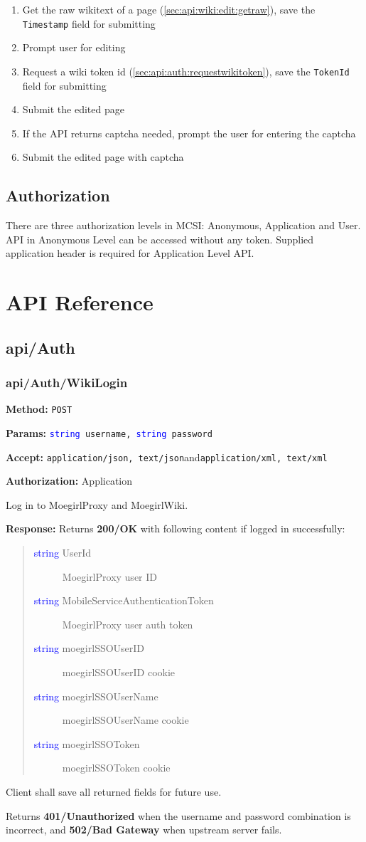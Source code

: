 \documentclass[a4paper,11pt]{report}
\newcommand{\method}[1]{\textsf{\textbf{Method:}} #1}
\newcommand{\params}[1]{\textsf{\textbf{Params:}} \texttt{#1}}
\newcommand{\accept}[1]{\textsf{\textbf{Accept:}} #1}
\newcommand{\response}[1]{\textsf{\textbf{Response:}} #1}
\newcommand{\auth}[1]{\textsf{\textbf{Authorization:}} #1}
\newcommand{\webapi}[6]{
    \method{#1}

    \params{#2}

    \accept{#3}

    \auth{#4}

    #5

    \response{#6}
    }
\newcommand{\sand}{\textsf{and}\xspace}
\newcommand{\httppost}{\texttt{POST}}
\newcommand{\json}{\texttt{application/json, text/json}\xspace}
\newcommand{\xml}{\texttt{application/xml, text/xml}\xspace}
\newcommand{\ok}{\textbf{200/OK}\xspace}
\newcommand{\unauth}{\textbf{401/Unauthorized}\xspace}
\newcommand{\badgateway}{\textbf{502/Bad Gateway}\xspace}
\newcommand{\authapp}{Application}
\newcommand{\typestring}{\textcolor{blue}{string }}
\begin{document}
\begin{enumerate}
    \item Get the raw wikitext of a page (\ref{sec:api:wiki:edit:getraw}), save the \texttt{Timestamp} field for submitting
    \item Prompt user for editing
    \item Request a wiki token id (\ref{sec:api:auth:requestwikitoken}), save the \texttt{TokenId} field for submitting
    \item Submit the edited page
    \item If the API returns captcha needed, prompt the user for entering the captcha
    \item Submit the edited page with captcha
\end{enumerate}

\section{Authorization}
There are three authorization levels in MCSI: Anonymous, Application and User. API in Anonymous Level can be accessed without any token. Supplied application header is required for Application Level API.

\chapter{API Reference}

\section{api/Auth}

\subsection{api/Auth/WikiLogin}
\label{sec:api:auth:wikilogin}
\webapi
{\httppost}
{\typestring username, \typestring password}
{\json \sand \xml}
{\authapp}
{Log in to MoegirlProxy and MoegirlWiki.}
{
Returns \ok with following content if logged in successfully:
    \begin{quote}
        \begin{description}
          \item[\textsf{\typestring UserId}] MoegirlProxy user ID
          \item[\textsf{\typestring MobileServiceAuthenticationToken}] MoegirlProxy user auth token
          \item[\textsf{\typestring moegirlSSOUserID}] moegirlSSOUserID cookie
          \item[\textsf{\typestring moegirlSSOUserName}] moegirlSSOUserName cookie
          \item[\textsf{\typestring moegirlSSOToken}] moegirlSSOToken cookie
        \end{description}
    \end{quote}

Client shall save all returned fields for future use.

Returns \unauth when the username and password combination is incorrect, and \badgateway when upstream server fails.
}
\end{document}
